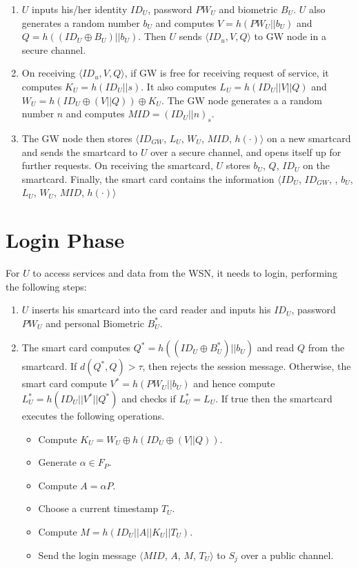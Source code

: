 \documentclass[a4paper,12pt]{report}
\begin{document}
\begin{enumerate}
\item $U$ inputs his/her identity $ID_{U}$, password $PW_U$ and
biometric $B_U$. $U$ also generates a random number $b_U$ and
computes $V = h(PW_{U} || b_{U})$ and $Q = h((ID_{U} \oplus
B_{U})||b_{U})$. Then $U$ sends $\langle ID_u, V, Q\rangle$ to GW
node in a secure channel.

\item On receiving $\langle ID_u, V, Q\rangle$, if GW is free for receiving request of service, it computes $K_{U}
= h(ID_{U}||s)$. It also computes $L_{U} = h(ID_{U} ||V||Q)$ and $
W_{U} = h(ID_{U} \oplus (V||Q)) \oplus K_U$. The GW node generates a
a random number $n$ and computes $MID = (ID_{U}||n)_{s}$.

\item The GW node then stores $\langle ID_{GW}$, $L_{U}$, $W_{U}$, $MID$,
$h(\cdot)\rangle$ on a new smartcard and sends the smartcard to $U$
over a secure channel, and opens itself up for further requests. On receiving the smartcard, $U$ stores
$b_{U}$, $Q$, $ID_{U}$ on the smartcard. Finally, the smart card
contains the information $\langle ID_{U}$, $ID_{GW}$, , $b_{U}$, %
$L_{U}$, $W_{U}$, $MID$, $h(\cdot)\rangle$
\end{enumerate}

\section{Login Phase}

For $U$ to access services and data from the WSN, it needs to login,
performing the following steps:

\begin{enumerate}
\item $U$ inserts his smartcard into the card reader and inputs his
$ID_{U}$, password $PW_{U}$ and personal Biometric $B_{U}^{*}$.

\item The smart card computes $Q^{*} = h((ID_{U}\oplus B_{U}^{*})||b_{U})$
and read $Q$ from the smartcard. If $d(Q^{*},Q) > \tau $, then
rejects the session message. Otherwise, the smart card compute
$V^{*} = h(PW_{U}|| b_{U})$ and hence compute $L_{U}^{*} =
h(ID_{U}||V^{*}||Q^{*})$ and checks if $L_{U}^{*} = L_{U}$. If true
then the smartcard executes the following operations.

\begin{itemize}
\item Compute $K_{U} = W_{U} \oplus h(ID_{U} \oplus (V||Q))$.
\item Generate $\alpha \in F_{P}$.
\item Compute $A = \alpha P$.
\item Choose a current timestamp $T_U$.
\item Compute $M = h(ID_{U}||A||K_{U}||T_{U})$.
\item Send the login message $\langle MID$, $A$, $M$, $T_{U}\rangle$ to $S_{j}$ over a public channel.
\end{itemize}
\end{enumerate}
\end{document}
